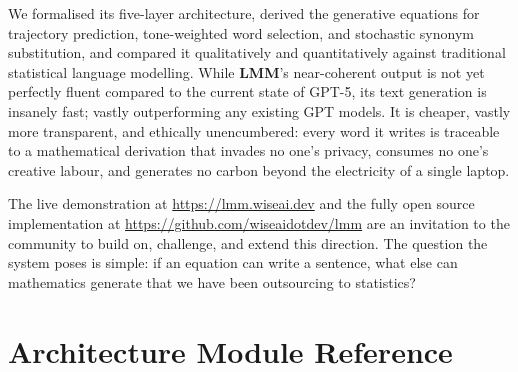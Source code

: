 \documentclass[11pt,a4paper]{article}
\newcommand{\lmm}{\texorpdfstring{%
  \textbf{\color{lmmAccent}LMM}}{LMM}}
\begin{document}
We formalised its five-layer architecture, derived the generative equations for trajectory prediction, tone-weighted word selection, and stochastic synonym substitution, and compared it qualitatively and quantitatively against traditional statistical language modelling. While \lmm{}'s near-coherent output is not yet perfectly fluent compared to the current state of GPT-5, its text generation is insanely fast; vastly outperforming any existing GPT models. It is cheaper, vastly more transparent, and ethically unencumbered: every word it writes is traceable to a mathematical derivation that invades no one's privacy, consumes no one's creative labour, and generates no carbon beyond the electricity of a single laptop.

The live demonstration at \url{https://lmm.wiseai.dev} and the fully open source implementation at \url{https://github.com/wiseaidotdev/lmm} are an invitation to the community to build on, challenge, and extend this direction. The question the system poses is simple: if an equation can write a sentence, what else can mathematics generate that we have been outsourcing to statistics?




\appendix

\section{Architecture Module Reference}
\label{app:modules}
\end{document}
